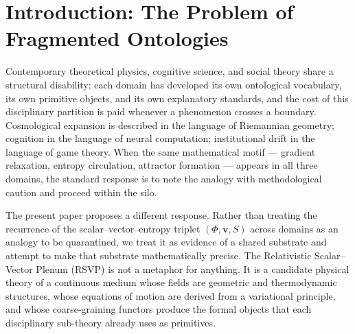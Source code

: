 \documentclass[12pt, a4paper]{article}
\theoremstyle{plain}
\theoremstyle{definition}
\theoremstyle{remark}
\newcommand{\vfield}{\mathbf{v}}
\begin{document}
\begin{titlepage}
\begin{abstract}
The theory is best characterised not as a cosmological alternative but as a
constrained nonequilibrium medium effective field theory whose geometric
coarse-graining induces effective spacetime curvature while entropy measures
admissible future trajectory volume.
\end{abstract}
\end{titlepage}

\newpage
\tableofcontents
\newpage

\section{Introduction: The Problem of Fragmented Ontologies}
\label{sec:intro}

Contemporary theoretical physics, cognitive science, and social theory share a structural
disability: each domain has developed its own ontological vocabulary, its own primitive
objects, and its own explanatory standards, and the cost of this disciplinary partition is
paid whenever a phenomenon crosses a boundary.  Cosmological expansion is described in
the language of Riemannian geometry; cognition in the language of neural computation;
institutional drift in the language of game theory.  When the same mathematical motif
--- gradient relaxation, entropy circulation, attractor formation --- appears in all three
domains, the standard response is to note the analogy with methodological caution and
proceed within the silo.

The present paper proposes a different response.  Rather than treating the recurrence of
the scalar--vector--entropy triplet $(\Phi, \vfield, S)$ across domains as an analogy to be
quarantined, we treat it as evidence of a shared substrate and attempt to make that
substrate mathematically precise.  The Relativistic Scalar--Vector Plenum (RSVP) is not
a metaphor for anything.  It is a candidate physical theory of a continuous medium whose
fields are geometric and thermodynamic structures, whose equations of motion are derived
from a variational principle, and whose coarse-graining functors produce the formal
objects that each disciplinary sub-theory already uses as primitives.
\end{document}
